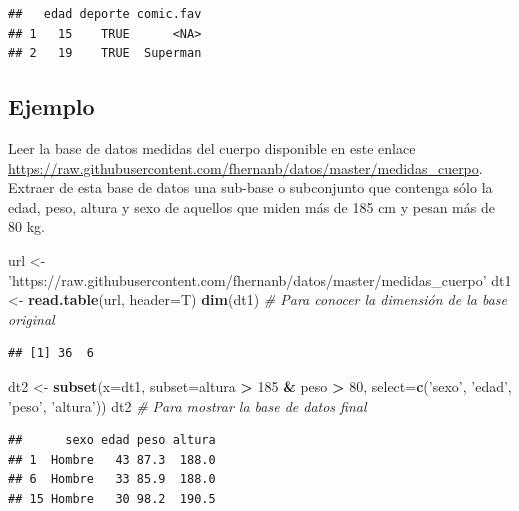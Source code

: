 \documentclass[10pt,]{krantz}
\makeatletter
\newenvironment{Shaded}{\begin{snugshade}}{\end{snugshade}}
\newcommand{\KeywordTok}[1]{\textcolor[rgb]{0.13,0.29,0.53}{\textbf{#1}}}
\newcommand{\DataTypeTok}[1]{\textcolor[rgb]{0.13,0.29,0.53}{#1}}
\newcommand{\DecValTok}[1]{\textcolor[rgb]{0.00,0.00,0.81}{#1}}
\newcommand{\StringTok}[1]{\textcolor[rgb]{0.31,0.60,0.02}{#1}}
\newcommand{\CommentTok}[1]{\textcolor[rgb]{0.56,0.35,0.01}{\textit{#1}}}
\newcommand{\OperatorTok}[1]{\textcolor[rgb]{0.81,0.36,0.00}{\textbf{#1}}}
\newcommand{\NormalTok}[1]{#1}
\newenvironment{kframe}{%
\medskip{}
\setlength{\fboxsep}{.8em}
 \def\at@end@of@kframe{}%
 \ifinner\ifhmode%
  \def\at@end@of@kframe{\end{minipage}}%
  \begin{minipage}{\columnwidth}%
 \fi\fi%
 \def\FrameCommand##1{\hskip\@totalleftmargin \hskip-\fboxsep
 \colorbox{shadecolor}{##1}\hskip-\fboxsep
     \hskip-\linewidth \hskip-\@totalleftmargin \hskip\columnwidth}%
 \MakeFramed {\advance\hsize-\width
   \@totalleftmargin\z@ \linewidth\hsize
   \@setminipage}}%
 {\par\unskip\endMakeFramed%
 \at@end@of@kframe}
\renewenvironment{Shaded}{\begin{kframe}}{\end{kframe}}
\makeatother
\begin{document}
\begin{verbatim}
##   edad deporte comic.fav
## 1   15    TRUE      <NA>
## 2   19    TRUE  Superman
\end{verbatim}

\subsection*{Ejemplo}\label{ejemplo-4}


Leer la base de datos medidas del cuerpo disponible en este enlace
\url{https://raw.githubusercontent.com/fhernanb/datos/master/medidas_cuerpo}.
Extraer de esta base de datos una sub-base o subconjunto que contenga
sólo la edad, peso, altura y sexo de aquellos que miden más de 185 cm y
pesan más de 80 kg.

\begin{Shaded}
\begin{Highlighting}[]
\NormalTok{url <-}\StringTok{ 'https://raw.githubusercontent.com/fhernanb/datos/master/medidas_cuerpo'}
\NormalTok{dt1 <-}\StringTok{ }\KeywordTok{read.table}\NormalTok{(url, }\DataTypeTok{header=}\NormalTok{T)}
\KeywordTok{dim}\NormalTok{(dt1)  }\CommentTok{# Para conocer la dimensión de la base original}
\end{Highlighting}
\end{Shaded}

\begin{verbatim}
## [1] 36  6
\end{verbatim}

\begin{Shaded}
\begin{Highlighting}[]
\NormalTok{dt2 <-}\StringTok{ }\KeywordTok{subset}\NormalTok{(}\DataTypeTok{x=}\NormalTok{dt1, }\DataTypeTok{subset=}\NormalTok{altura }\OperatorTok{>}\StringTok{ }\DecValTok{185} \OperatorTok{&}\StringTok{ }\NormalTok{peso }\OperatorTok{>}\StringTok{ }\DecValTok{80}\NormalTok{,}
              \DataTypeTok{select=}\KeywordTok{c}\NormalTok{(}\StringTok{'sexo'}\NormalTok{, }\StringTok{'edad'}\NormalTok{, }\StringTok{'peso'}\NormalTok{, }\StringTok{'altura'}\NormalTok{))}
\NormalTok{dt2  }\CommentTok{# Para mostrar la base de datos final}
\end{Highlighting}
\end{Shaded}

\begin{verbatim}
##      sexo edad peso altura
## 1  Hombre   43 87.3  188.0
## 6  Hombre   33 85.9  188.0
## 15 Hombre   30 98.2  190.5
\end{verbatim}
\end{document}
